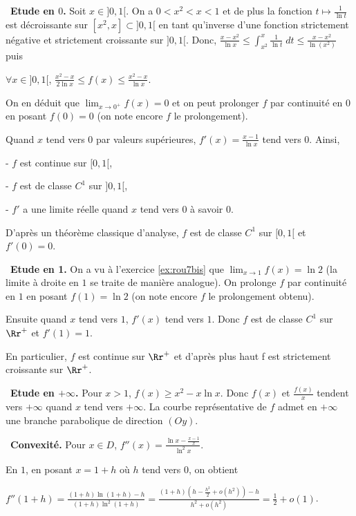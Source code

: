 {{ 

 \textbullet~\textbf{Etude en $0$.}
Soit $x\in]0,1[$. On a $0<x^2 < x < 1$ et de plus la fonction $t\mapsto\frac{1}{\ln t}$ est décroissante sur $[x^2,x]\subset]0,1[$ en tant qu'inverse d'une fonction strictement négative et strictement croissante sur $]0,1[$. Donc, $\frac{x-x^2}{\ln x}\leqslant\int_{x^2}^{x}\frac{1}{\ln t}\;dt\leqslant\frac{x-x^2}{\ln(x^2)}$ puis

\begin{center}
$\forall x\in]0,1[$,  $\frac{x^2-x}{2\ln x}\leqslant f(x)\leqslant\frac{x^2-x}{\ln x}$.
\end{center}

On en déduit que $\lim_{x \rightarrow 0^+}f(x) = 0$ et on peut prolonger $f$ par continuité en $0$ en posant $f(0) = 0$ (on note encore $f$ le prolongement).

Quand $x$ tend vers $0$ par valeurs supérieures, $f'(x) =\frac{x-1}{\ln x}$  tend vers 0. Ainsi,

- $f$ est continue sur $[0,1[$,

- $f$ est de classe $C^1$ sur $]0,1[$,

- $f'$ a une limite réelle quand $x$ tend vers $0$ à savoir $0$.

D'après un théorème classique d'analyse, $f$ est de classe $C^1$ sur $[0,1[$ et $f'(0) = 0$.

 \textbullet~\textbf{Etude en 1.} On a vu à l'exercice \ref{ex:rou7bis} que $\lim_{x \rightarrow 1}f(x)=\ln2$ (la limite à droite en $1$ se traite de manière analogue). On prolonge $f$ par continuité en $1$ en posant $f(1) =\ln2$ (on note encore $f$ le prolongement obtenu).
 

Ensuite quand $x$ tend vers $1$, $f'(x)$ tend vers $1$. Donc $f$ est de classe $C^1$ sur $\Rr^+$ et $f'(1)=1$.

En particulier, $f$ est continue sur $\Rr^+$ et d'après plus haut f est strictement croissante sur $\Rr^+$.

 \textbullet~\textbf{Etude en $+\infty$.} Pour  $x > 1$, $f(x)\geqslant{x^2-x}{\ln x}$. Donc $f(x)$ et $\frac{f(x)}{x}$ tendent vers $+\infty$  quand $x$ tend vers $+\infty$.
La courbe représentative de $f$ admet en $+\infty$ une branche parabolique de direction $(Oy)$.

 \textbullet~\textbf{Convexité.} Pour $x\in D$, $f''(x)=\frac{\ln x-\frac{x-1}{x}}{\ln^2x}$.
 

En $1$, en posant $x = 1+h$ où $h$ tend vers $0$, on obtient

\begin{center}
$f''(1+h)=\frac{(1+h)\ln(1+h)-h}{(1+h)\ln^2(1+h)}=\frac{(1+h)\left(h-\frac{h^2}{2}+o(h^2)\right)-h}{h^2+o(h^2)}=\frac{1}{2}+o(1)$.
\end{center}

}}
